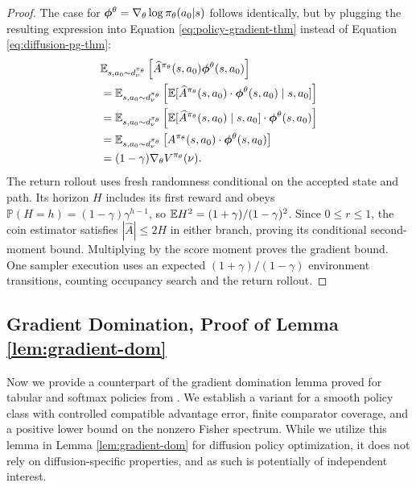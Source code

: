 \begin{proof}
    The case for $\boldsymbol{\phi}^\theta = \nabla_\theta \log \pi_\theta(a_0 | s)$ follows identically, but by plugging the resulting expression into Equation \ref{eq:policy-gradient-thm} instead of Equation \ref{eq:diffusion-pg-thm}:
    \begin{align}
        &\mathbb{E}_{s,a_0 \sim d_{\nu}^{\pi_\theta}}\left[\widehat{A}^{\pi_\theta}(s, a_0){\boldsymbol{\phi}}^{\theta}(s, a_0)\right] \\
        &=  \mathbb{E}_{s,a_0 \sim d_{\nu}^{\pi_\theta}}\left[\mathbb{E}[\widehat{A}^{\pi_\theta}(s, a_0) \cdot {\boldsymbol{\phi}}^{\theta}(s, a_{0})  \mid s, a_{0}]\right] \\
        &=  \mathbb{E}_{s,a_0 \sim d_{\nu}^{\pi_\theta}}\left[\mathbb{E}[\widehat{A}^{\pi_\theta}(s, a_0) \mid s, a_0] \cdot {\boldsymbol{\phi}}^{\theta}(s, a_0)\right] \\
        &= \mathbb{E}_{s,a_0 \sim d_{\nu}^{\pi_\theta}}\left[A^{\pi_\theta}(s, a_0) \cdot {\boldsymbol{\phi}}^{\theta}(s, a_0)\right] \\
        &= (1-\gamma)\nabla_\theta V^{\pi_\theta}(\nu).
    \end{align}
The return rollout uses fresh randomness conditional on the accepted state
and path. Its horizon $H$ includes its first reward and obeys
$\mathbb{P}(H=h)=(1-\gamma)\gamma^{h-1}$, so
$\mathbb{E} H^2=(1+\gamma)/(1-\gamma)^2$. Since $0\leq r\leq1$, the coin estimator
satisfies $|\widehat A|\leq2H$ in either branch, proving its conditional
second-moment bound. Multiplying by the score moment proves the gradient
bound. One sampler execution uses an expected $(1+\gamma)/(1-\gamma)$
environment transitions, counting occupancy search and the return rollout.
\end{proof}

\subsection{Gradient Domination, Proof of Lemma \ref{lem:gradient-dom}}

Now we provide a counterpart of the gradient domination lemma proved for tabular and softmax policies from \citet{agarwal2020pcpgpolicycoverdirected}. We establish a variant for a smooth policy class with controlled compatible advantage error, finite comparator coverage, and a positive lower bound on the nonzero Fisher spectrum. While we utilize this lemma in Lemma \ref{lem:gradient-dom} for diffusion policy optimization, it does not rely on diffusion-specific properties, and as such is potentially of independent interest. 

